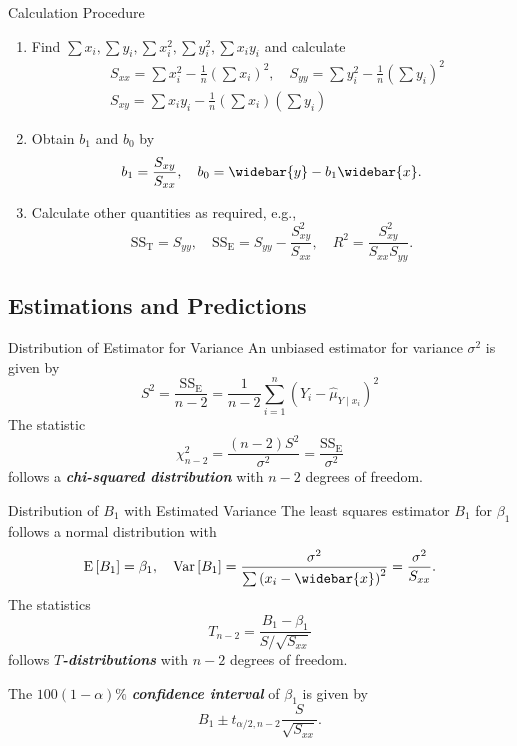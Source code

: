 \documentclass{beamer}
\newcommand{\bb}[1]{\textcolor{antiquefuchsia}{\textbf{\textit{#1}}}}
\begin{document}
\begin{frame}{Calculation Procedure}
\begin{enumerate}
\item Find $\sum x_{i}, \sum y_{i}, \sum x_{i}^{2}, \sum y_{i}^{2}, \sum x_{i} y_{i}$ and calculate
$$
\begin{aligned}
&S_{x x}=\sum x_{i}^{2}-\frac{1}{n}\left(\sum x_{i}\right)^{2}, \quad S_{y y}=\sum y_{i}^{2}-\frac{1}{n}\left(\sum y_{i}\right)^{2} \\
&S_{x y}=\sum x_{i} y_{i}-\frac{1}{n}\left(\sum x_{i}\right)\left(\sum y_{i}\right)
\end{aligned}
$$
\item Obtain $b_{1}$ and $b_{0}$ by
$$
b_{1}=\frac{S_{x y}}{S_{x x}}, \quad b_{0}=\widebar{y}-b_{1} \widebar{x} .
$$
\item Calculate other quantities as required, e.g.,
$$
\mathrm{SS}_{\mathrm{T}}=S_{y y},\quad \mathrm{SS}_{\mathrm{E}}=S_{y y}-\frac{S^2_{x y}}{S_{x x}}, \quad R^{2}=\frac{S_{x y}^{2}}{S_{x x} S_{y y}} .
$$
\end{enumerate}
\end{frame}

\subsection{Estimations and Predictions}
\begin{frame}{Distribution of Estimator for Variance}
An unbiased estimator for variance $\sigma^{2}$ is given by
$$
S^{2}=\frac{\mathrm{SS}_{\mathrm{E}}}{n-2}=\frac{1}{n-2} \sum_{i=1}^{n}\left(Y_{i}-\widehat{\mu}_{Y \mid x_{i}}\right)^{2}
$$
The statistic
$$
\chi_{n-2}^{2}=\frac{(n-2) S^{2}}{\sigma^{2}}=\frac{\mathrm{SS}_{\mathrm{E}}}{\sigma^{2}}
$$
follows a \bb{chi-squared distribution} with $n-2$ degrees of freedom.

\end{frame}

\begin{frame}{Distribution of $B_1$ with Estimated Variance}
The least squares estimator $B_{1}$ for $\beta_{1}$ follows a normal distribution with
$$
\mathrm{E}\left[B_{1}\right]=\beta_{1}, \quad \operatorname{Var}\left[B_{1}\right]=\frac{\sigma^{2}}{\sum\left(x_{i}-\widebar{x}\right)^{2}}=\frac{\sigma^{2}}{S_{x x}} .
$$
The statistics
$$
T_{n-2}=\frac{B_{1}-\beta_{1}}{S / \sqrt{S_{x x}}}
$$
follows \bb{$T$-distributions} with $n-2$ degrees of freedom.

The $100(1-\alpha) \%$ \bb{confidence interval} of $\beta_{1}$ is given by
$$
B_{1} \pm t_{\alpha / 2, n-2} \frac{S}{\sqrt{S_{x x}}} .
$$
\end{frame}
\end{document}
